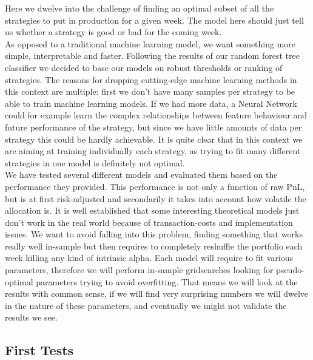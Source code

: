 \documentclass[12pt]{article} %
\numberwithin{equation}{subsection}
\begin{document}
Here we dwelve into the challenge of finding an optimal subset of all the strategies to put in production for a given week. The model here should just tell us whether a strategy is good or bad for the coming week.\\
As opposed to a traditional machine learning model, we want something more simple, interpretable and faster. Following the results of our random forest tree classifier we decided to base our models on robust thresholds or ranking of strategies. The reasons for dropping cutting-edge machine learning methods in this context are multiple: first we don't have many samples per strategy to be able to train machine learning models. If we had more data, a Neural Network could for example learn the complex relationships between feature behaviour and future performance of the strategy, but since we have little amounts of data per strategy this could be hardly achievable. It is quite clear that in this context we are aiming at training individually each strategy, as trying to fit many different strategies in one model is definitely not optimal.\\
We have tested several different models and evaluated them based on the performance they provided. This performance is not only a function of raw PnL, but is at first risk-adjusted and secondarily it takes into account how volatile the allocation is. It is well established that some interesting theoretical models just don't work in the real world because of transaction-costs and implementation issues. We want to avoid falling into this problem, finding something that works really well in-sample but then requires to completely reshuffle the portfolio each week killing any kind of intrinsic alpha.
Each model will require to fit various parameters, therefore we will perform in-sample gridsearches looking for pseudo-optimal parameters trying to avoid overfitting. That means we will look at the results with common sense, if we will find very surprising numbers we will dwelve in the nature of these parameters, and eventually we might not validate the results we see.\\


\subsection{First Tests}
\end{document}
